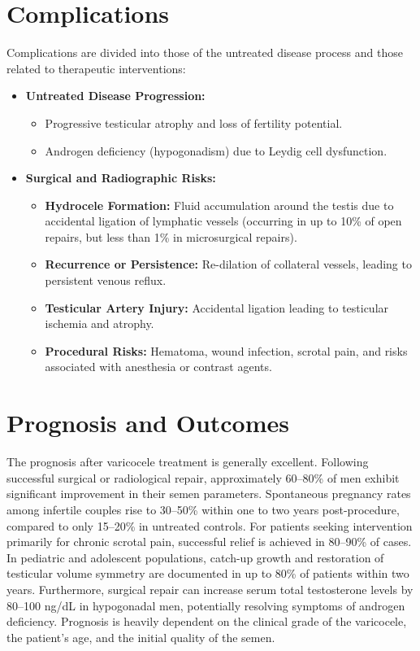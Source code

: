 \section*{Complications}
Complications are divided into those of the untreated disease process and those related to therapeutic interventions:
\begin{itemize}
  \item \textbf{Untreated Disease Progression:}
  \begin{itemize}
    \item Progressive testicular atrophy and loss of fertility potential.
    \item Androgen deficiency (hypogonadism) due to Leydig cell dysfunction.
  \end{itemize}
  \item \textbf{Surgical and Radiographic Risks:}
  \begin{itemize}
    \item \textbf{Hydrocele Formation:} Fluid accumulation around the testis due to accidental ligation of lymphatic vessels (occurring in up to 10\% of open repairs, but less than 1\% in microsurgical repairs).
    \item \textbf{Recurrence or Persistence:} Re-dilation of collateral vessels, leading to persistent venous reflux.
    \item \textbf{Testicular Artery Injury:} Accidental ligation leading to testicular ischemia and atrophy.
    \item \textbf{Procedural Risks:} Hematoma, wound infection, scrotal pain, and risks associated with anesthesia or contrast agents.
  \end{itemize}
\end{itemize}

\section*{Prognosis and Outcomes}
The prognosis after varicocele treatment is generally excellent. Following successful surgical or radiological repair, approximately 60--80\% of men exhibit significant improvement in their semen parameters. Spontaneous pregnancy rates among infertile couples rise to 30--50\% within one to two years post-procedure, compared to only 15--20\% in untreated controls. For patients seeking intervention primarily for chronic scrotal pain, successful relief is achieved in 80--90\% of cases. In pediatric and adolescent populations, catch-up growth and restoration of testicular volume symmetry are documented in up to 80\% of patients within two years. Furthermore, surgical repair can increase serum total testosterone levels by 80--100 ng/dL in hypogonadal men, potentially resolving symptoms of androgen deficiency. Prognosis is heavily dependent on the clinical grade of the varicocele, the patient's age, and the initial quality of the semen.

